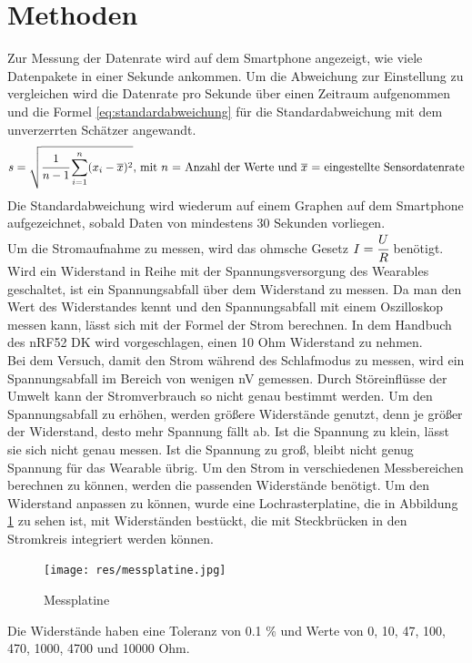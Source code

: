 \section{Methoden}
Zur Messung der Datenrate wird auf dem Smartphone angezeigt, wie viele Datenpakete in einer Sekunde ankommen.
Um die Abweichung zur Einstellung zu vergleichen wird die Datenrate pro Sekunde über einen Zeitraum aufgenommen und die Formel \ref{eq:standardabweichung} für die Standardabweichung mit dem unverzerrten Schätzer angewandt.
\begin{equation}
  \label{eq:standardabweichung}
	s = \sqrt{\cfrac{1}{n-1}\sum_{i=1}^{n} (x_{i}-\overline{x})^{2}}\text{, mit $n$ = Anzahl der Werte und $\overline{x}$ = eingestellte Sensordatenrate}
\end{equation}
Die Standardabweichung wird wiederum auf einem Graphen auf dem Smartphone aufgezeichnet, sobald Daten von mindestens 30 Sekunden vorliegen.\\
Um die Stromaufnahme zu messen, wird das ohmsche Gesetz $I = \cfrac{U}{R}$ benötigt.
Wird ein Widerstand in Reihe mit der Spannungsversorgung des Wearables geschaltet, ist ein Spannungsabfall über dem Widerstand zu messen.
Da man den Wert des Widerstandes kennt und den Spannungsabfall mit einem Oszilloskop messen kann, lässt sich mit der Formel der Strom berechnen.
In dem Handbuch des nRF52 DK wird vorgeschlagen, einen 10 Ohm Widerstand zu nehmen. \cite{site_nrf52dk}\\
Bei dem Versuch, damit den Strom während des Schlafmodus zu messen, wird ein Spannungsabfall im Bereich von wenigen nV gemessen.
Durch Störeinflüsse der Umwelt kann der Stromverbrauch so nicht genau bestimmt werden.
Um den Spannungsabfall zu erhöhen, werden größere Widerstände genutzt, denn je größer der Widerstand, desto mehr Spannung fällt ab.
Ist die Spannung zu klein, lässt sie sich nicht genau messen.
Ist die Spannung zu groß, bleibt nicht genug Spannung für das Wearable übrig.
Um den Strom in verschiedenen Messbereichen berechnen zu können, werden die passenden Widerstände benötigt.
Um den Widerstand anpassen zu können, wurde eine Lochrasterplatine, die in Abbildung \ref{fig:messplatine} zu sehen ist, mit Widerständen bestückt, die mit Steckbrücken in den Stromkreis integriert werden können.
\begin{figure}[hbtp]
	\centering
	\texttt{[image: res/messplatine.jpg]}
	\caption{Messplatine}
	\label{fig:messplatine}
\end{figure}
Die Widerstände haben eine Toleranz von 0.1 \% und Werte von 0, 10, 47, 100, 470, 1000, 4700 und 10000 Ohm.\\
